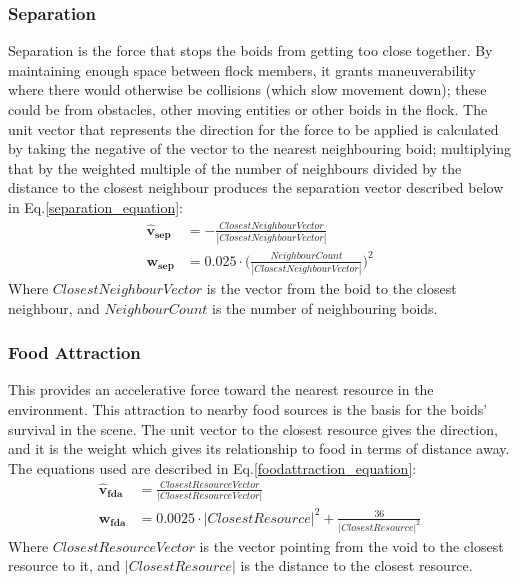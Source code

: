 \subsubsection{Separation}
Separation is the force that stops the boids from getting too close together. By maintaining enough space between flock members, it grants maneuverability where there would otherwise be collisions (which slow movement down); these could be from obstacles, other moving entities or other boids in the flock. The unit vector that represents the direction for the force to be applied is calculated by taking the negative of the vector to the nearest neighbouring boid; multiplying that by the weighted multiple of the number of neighbours divided by the distance to the closest neighbour produces the separation vector described below in Eq.\ref{separation_equation}:
\begin{equation}
\begin{split}
	\boldsymbol{\hat{v}_{sep}} &= -\frac{ClosestNeighbourVector} {| ClosestNeighbourVector|} \\
	\boldsymbol{w_{sep}} &= 0.025 \cdot  \Big(\frac{NeighbourCount} {|ClosestNeighbourVector|}\Big)^2
\end{split}
\label{separation_equation}
\end{equation}
Where $ClosestNeighbourVector$ is the vector from the boid to the closest neighbour, and $NeighbourCount$ is the number of neighbouring boids.


\subsubsection{Food Attraction}
This provides an accelerative force toward the nearest resource in the environment. This attraction to nearby food sources is the basis for the boids' survival in the scene. The unit vector to the closest resource gives the direction, and it is the weight which gives its relationship to food in terms of distance away. The equations used are described in Eq.\ref{foodattraction_equation}:
\begin{equation}
\begin{split}
\boldsymbol{\hat{v}_{fda}} &= \frac{ClosestResourceVector} {|ClosestResourceVector|} \\
\boldsymbol{w_{fda}} &= 0.0025 \cdot |ClosestResource|^2 + \frac{36} {|ClosestResource|^2}
\end{split}
\label{foodattraction_equation}
\end{equation}
Where $ClosestResourceVector$ is the vector pointing from the void to the closest resource to it, and $|ClosestResource|$ is the distance to the closest resource.


